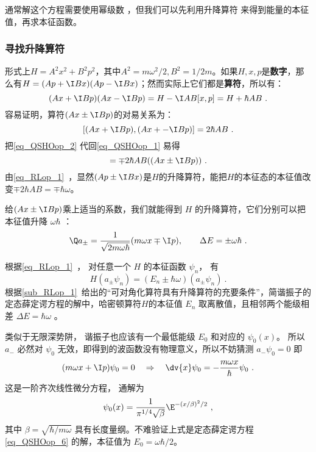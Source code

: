 通常解这个方程需要使用幂级数%
，但我们可以先利用升降算符 来得到能量的本征值，再求本征函数。


\subsubsection{寻找升降算符}

形式上$H=A^2x^2+B^2p^2$，其中$A^2=m\omega^2/2, B^2=1/2m$。如果$H, x, p$是\textbf{数字}，那么有$H = (Ap+\I Bx)(Ap-\I Bx)$；然而实际上它们都是\textbf{算符}，所以有：
\begin{equation}\label{eq_QSHOop_1}
(Ax+\I Bp)(Ax-\I Bp) = H-\I AB[x, p] = H+\hbar AB~.
\end{equation}
容易证明，算符$(Ax\pm\I Bp)$的对易关系为：
\begin{equation}\label{eq_QSHOop_2}
[(Ax+\I Bp), (Ax+-\I Bp)] = 2\hbar AB~.
\end{equation}
把\autoref{eq_QSHOop_2} 代回\autoref{eq_QSHOop_1} 易得
\begin{equation}
[H, (Ax\pm\I Bp) = [H+ \hbar AB, (Ax\pm\I Bp)] = \mp 2\hbar AB ((Ax\pm\I Bp))~.
\end{equation}
由\autoref{eq_RLop_1}~，显然$(Ap\pm \I Bx)$是$H$的升降算符，能把$H$的本征态的本征值改变$\mp 2\hbar AB=\mp \hbar \omega$。

给$(Ax\pm\I Bp)$乘上适当的系数，我们就能得到 $H$ 的升降算符，它们分别可以把本征值升降 $\omega\hbar$ ：
\begin{equation}
\Q a_\pm = \frac{1}{\sqrt{2m\omega\hbar}} (m\omega x \mp \I p), 
\qquad
\Delta E = \pm \omega \hbar~.
\end{equation}

根据\autoref{eq_RLop_1}~， 对任意一个 $H$ 的本征函数 $\psi_n$， 有
\begin{equation}
H(a_\pm\psi_n) = (E_n\pm\hbar\omega) (a_ \pm \psi_n)~.
\end{equation}
根据\autoref{sub_RLop_1}~给出的“可对角化算符具有升降算符的充要条件”，简谐振子的定态薛定谔方程的解中，哈密顿算符$H$的本征值 $E_n$ 取离散值，且相邻两个能级相差 $\Delta E = \hbar \omega$ 。



类似于无限深势阱， 谐振子也应该有一个最低能级 $E_0$ 和对应的 $\psi_0(x)$。 所以 $a_-$ 必然对 $\psi_0$ 无效，即得到的波函数没有物理意义，所以不妨猜测 $a_- \psi_0 = 0$ 
即
\begin{equation}
(m\omega x + \I p)\psi_0 = 0
\quad \Rightarrow \quad
\dv{x} \psi_0 =  - \frac{m\omega x}{\hbar } \psi_0~.
\end{equation}
这是一阶齐次线性微分方程，%
通解为
\begin{equation}
\psi_0(x) = \frac{1}{\pi^{1/4}\sqrt\beta} \E^{-(x/\beta)^2/2}~,
\end{equation}
其中 $\beta = \sqrt{\hbar /m\omega}$ 具有长度量纲。不难验证上式是定态薛定谔方程\autoref{eq_QSHOop_6} 的解，本征值为 $E_0=\omega\hbar/2$。



